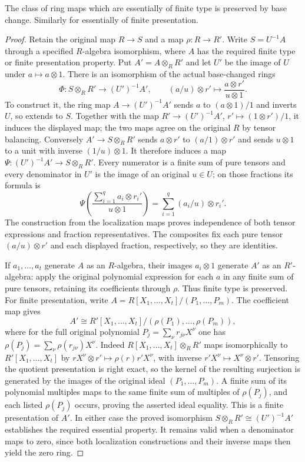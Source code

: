 \begin{lemma}
\label{editorial-source-lemma-base-change-essentially-of-finite-type}
The class of ring maps which are essentially of finite type is
preserved by base change. Similarly for essentially of finite
presentation.
\end{lemma}

\begin{proof}
Retain the original map $R\to S$ and a map $\rho:R\to R'$.
Write $S=U^{-1}A$ through a specified $R$-algebra isomorphism,
where $A$ has the required finite type or finite presentation
property. Put $A'=A\otimes_R R'$ and let $U'$ be the image
of $U$ under $a\mapsto a\otimes1$.
There is an isomorphism of the actual base-changed rings
$$
\Phi:S\otimes_R R'\longrightarrow (U')^{-1}A',
\qquad
(a/u)\otimes r'\longmapsto
\frac{a\otimes r'}{u\otimes1}.
$$
To construct it, the ring map $A\to(U')^{-1}A'$ sends
$a$ to $(a\otimes1)/1$ and inverts $U$, so extends to $S$.
Together with the map $R'\to(U')^{-1}A'$,
$r'\mapsto(1\otimes r')/1$, it induces the displayed map;
the two maps agree on the original $R$ by tensor balancing.
Conversely $A'\to S\otimes_R R'$ sends
$a\otimes r'$ to $(a/1)\otimes r'$ and sends $u\otimes1$
to a unit with inverse $(1/u)\otimes1$.
It therefore induces a map $\Psi:(U')^{-1}A'\to S\otimes_R R'$.
Every numerator is a finite sum of pure tensors and every
denominator in $U'$ is the image of an original $u\in U$;
on those fractions its formula is
$$
\Psi\left(\frac{\sum_{i=1}^q a_i\otimes r_i'}{u\otimes1}\right)
=\sum_{i=1}^q(a_i/u)\otimes r_i'.
$$
The construction from the localization maps proves independence
of both tensor expressions and fraction representatives.
The composites fix each pure tensor $(a/u)\otimes r'$ and
each displayed fraction, respectively, so they are identities.

If $a_1,\ldots,a_t$ generate $A$ as an $R$-algebra, their
images $a_i\otimes1$ generate $A'$ as an $R'$-algebra:
apply the original polynomial expression for each $a$ in any
finite sum of pure tensors, retaining its coefficients through
$\rho$. Thus finite type is preserved.
For finite presentation, write
$A=R[X_1,\ldots,X_t]/(P_1,\ldots,P_m)$.
The coefficient map gives
$$
A'\cong R'[X_1,\ldots,X_t]/(\rho(P_1),\ldots,\rho(P_m)),
$$
where for the full original polynomial
$P_j=\sum_\nu r_{j\nu}X^\nu$ one has
$\rho(P_j)=\sum_\nu\rho(r_{j\nu})X^\nu$.
Indeed $R[X_1,\ldots,X_t]\otimes_R R'$ maps isomorphically
to $R'[X_1,\ldots,X_t]$ by
$rX^\nu\otimes r'\mapsto\rho(r)r'X^\nu$, with inverse
$r'X^\nu\mapsto X^\nu\otimes r'$.
Tensoring the quotient presentation is right exact, so the
kernel of the resulting surjection is generated by the images
of the original ideal $(P_1,\ldots,P_m)$.
A finite sum of its polynomial multiples maps to the same
finite sum of multiples of $\rho(P_j)$, and each listed
$\rho(P_j)$ occurs, proving the asserted ideal equality.
This is a finite presentation of $A'$.
In either case the proved isomorphism $S\otimes_R R'\cong
(U')^{-1}A'$ establishes the required essential property.
It remains valid when a denominator maps to zero, since both
localization constructions and their inverse maps then yield
the zero ring.
\end{proof}